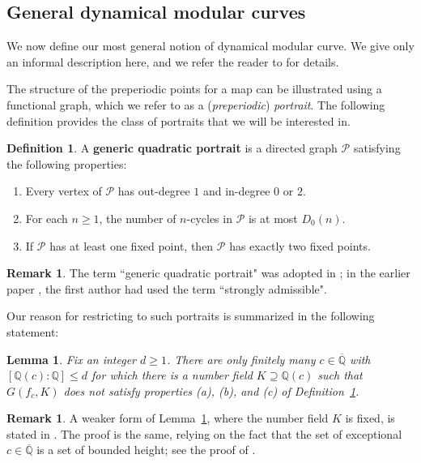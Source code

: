 \documentclass[12pt]{amsart}
\newtheorem{lem}[thm]{Lemma}
\theoremstyle{definition}
\newtheorem{defn}[thm]{Definition}
\newtheorem{rem}[thm]{Remark}
\newcommand{\bbQ}{\mathbb{Q}}
\newcommand{\calP}{\mathcal{P}}
\newcommand{\QQbar}{\overline{\bbQ}}
\numberwithin{equation}{section}
\begin{document}
\subsection{General dynamical modular curves}\label{sec:genDMC}
We now define our most general notion of dynamical modular curve. We give only an informal description here, and we refer the reader to \cite{doyle:2019} for details.

The structure of the preperiodic points for a map can be illustrated using a functional graph, which we refer to as a ({\it preperiodic}) {\it portrait}. The following definition provides the class of portraits that we will be interested in.

\begin{defn}\label{defn:gen-quad}
    A {\bf generic quadratic portrait} is a directed graph $\calP$ satisfying the following properties:
    \begin{enumerate}
        \item Every vertex of $\calP$ has out-degree $1$ and in-degree $0$ or $2$.
        \item For each $n \ge 1$, the number of $n$-cycles in $\calP$ is at most $D_0(n)$.
        \item If $\calP$ has at least one fixed point, then $\calP$ has exactly two fixed points.
    \end{enumerate}
\end{defn}

\begin{rem}
    The term ``generic quadratic portrait" was adopted in \cite{doyle/krumm:2024}; in the earlier paper \cite{doyle:2019}, the first author had used the term ``strongly admissible".
\end{rem}

Our reason for restricting to such portraits is summarized in the following statement:

\begin{lem}\label{lem:finitely-many-PCF-1/4}
    Fix an integer $d \ge 1$. There are only finitely many $c \in \QQbar$ with $[\bbQ(c) : \bbQ] \le d$ for which there is a number field $K \supseteq \bbQ(c)$ such that $G(f_c,K)$ does not satisfy properties {\rm (a)}, {\rm (b)}, and {\rm (c)} of Definition~\ref{defn:gen-quad}.
\end{lem}

\begin{rem}
    A weaker form of Lemma~\ref{lem:finitely-many-PCF-1/4}, where the number field $K$ is fixed, is stated in \cite[Corollary 2.6]{doyle:2019}. The proof is the same, relying on the fact that the set of exceptional $c \in \QQbar$ is a set of bounded height; see the proof of \cite[Proposition 4.22]{silverman:2007}.
\end{rem}
\end{document}

